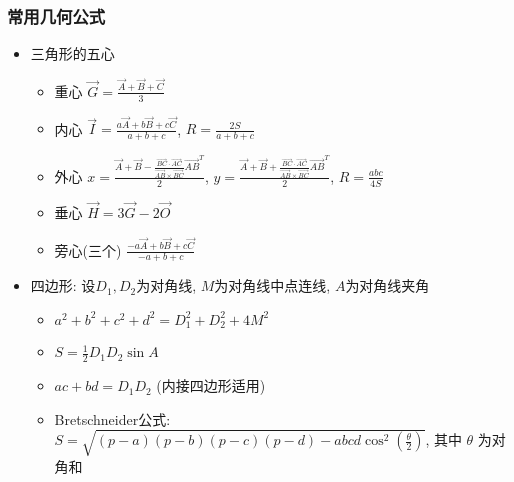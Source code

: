\documentclass[landscape, twocolumn, 8pt, a4paper, twoside]{extarticle}
\begin{document}
    \subsubsection{常用几何公式}
    \begin{itemize}
    \item 三角形的五心
      \begin{itemize}
      \item 重心 $\overrightarrow{G} = \frac{\overrightarrow{A} + \overrightarrow{B} + \overrightarrow{C}}{3}$
      \item
        内心 $\overrightarrow{I} = \frac{a\overrightarrow{A} + b\overrightarrow{B} + c\overrightarrow{C}}{a + b + c}$,
        $R = \frac{2S}{a + b + c}$
      \item
        外心
        $x = \frac{\overrightarrow{A} + \overrightarrow{B} - \frac{\overrightarrow{BC} \cdot \overrightarrow{AC}}{\overrightarrow{AB} \times \overrightarrow{BC}} \overrightarrow{AB}^{T}}{2}$,
        $y = \frac{\overrightarrow{A} + \overrightarrow{B} + \frac{\overrightarrow{BC} \cdot \overrightarrow{AC}}{\overrightarrow{AB} \times \overrightarrow{BC}} \overrightarrow{AB}^{T}}{2}$,
        $R = \frac{abc}{4S}$
      \item
        垂心 $\overrightarrow{H} = 3\overrightarrow{G} - 2\overrightarrow{O}$
      \item
        旁心(三个) $\frac{-a\overrightarrow{A} + b\overrightarrow{B} + c\overrightarrow{C}}{-a + b + c}$
      \end{itemize}

    \item 四边形: 设$D_1, D_2$为对角线, $M$为对角线中点连线, $A$为对角线夹角
      \begin{itemize}
      \item $a^2 + b^2 + c^2 + d^2 = D_1^2 + D_2 ^ 2 + 4 M^2$
      \item $S = \frac{1}{2} D_1  D_2 \sin A$
      \item $ac + bd = D_1 D_2$ (内接四边形适用)
      \item Bretschneider公式:
        $S = \sqrt{(p - a)(p - b)(p - c)(p - d) - abcd \cos^2(\frac{\theta}{2})}$, 其中 $\theta$ 为对角和
      \end{itemize}
    \end{itemize}
\end{document}

